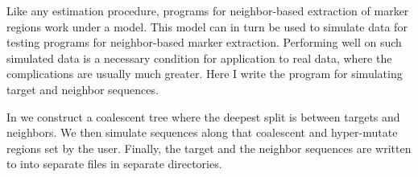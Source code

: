 Like any estimation procedure, programs for neighbor-based extraction
of marker regions work under a model. This model can in turn be used
to simulate data for testing programs for neighbor-based marker
extraction. Performing well on such simulated data is a necessary
condition for application to real data, where the complications are
usually much greater. Here I write the program  for
simulating target and neighbor sequences.

In  we construct a coalescent tree where the deepest split is
between targets and neighbors. We then simulate sequences along that
coalescent and hyper-mutate regions set by the user. Finally, the
target and the neighbor sequences are written to into separate files
in separate directories.
